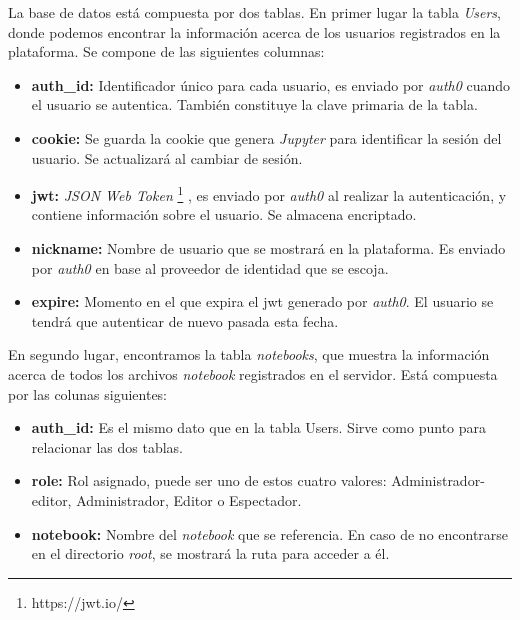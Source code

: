 \documentclass[11pt,spanish,listoffigures,listoftables]{tfgetsinf}
\begin{document}
La base de datos está compuesta por dos tablas. En primer lugar la tabla \textit{Users}, donde podemos encontrar la información acerca de los usuarios registrados en la plataforma. Se compone de las siguientes columnas:

\begin{itemize}

\item \textbf{auth\_id:} Identificador único para cada usuario, es enviado por \textit{auth0} cuando el usuario se autentica. También constituye la clave primaria de la tabla.

\item \textbf{cookie:} Se guarda la cookie que genera \textit{Jupyter} para identificar la sesión del usuario. Se actualizará al cambiar de sesión.

\item \textbf{jwt:} \textit{JSON Web Token} \footnote{https://jwt.io/} , es enviado por \textit{auth0} al realizar la autenticación, y contiene información sobre el usuario. Se almacena encriptado.

\item \textbf{nickname:} Nombre de usuario que se mostrará en la plataforma. Es enviado por \textit{auth0} en base al proveedor de identidad que se escoja.

\item \textbf{expire:} Momento en el que expira el jwt generado por \textit{auth0}. El usuario se tendrá que autenticar de nuevo pasada esta fecha.

\end{itemize}

En segundo lugar, encontramos la tabla \textit{notebooks}, que muestra la información acerca de todos los archivos \textit{notebook} registrados en el servidor. Está compuesta por las colunas siguientes:

\begin{itemize}

\item \textbf{auth\_id:} Es el mismo dato que en la tabla Users. Sirve como punto para relacionar las dos tablas. 

\item \textbf{role:} Rol asignado, puede ser uno de estos cuatro valores: Administrador-editor, Administrador, Editor o Espectador.

\item \textbf{notebook:} Nombre del \textit{notebook} que se referencia. En caso de no encontrarse en el directorio \textit{root}, se mostrará la ruta para acceder a él.

\end{itemize}
\end{document}
